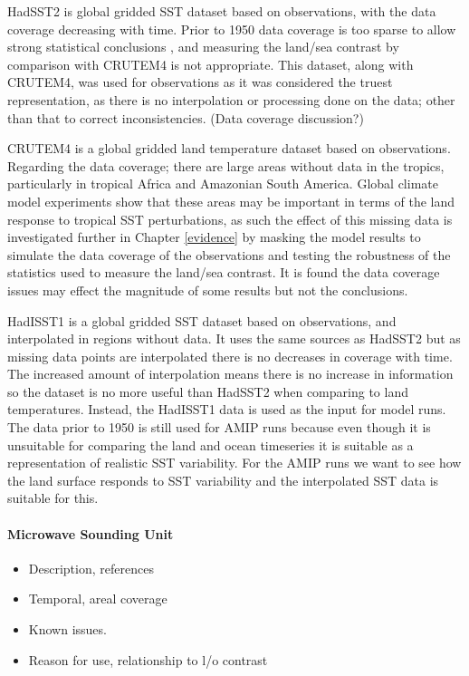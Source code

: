 HadSST2 is global gridded SST dataset based on observations, with the data 
coverage decreasing with time. Prior to 1950 data coverage is too sparse to 
allow strong statistical conclusions \citep{Dommenget2009}, and measuring the 
land/sea contrast by comparison with CRUTEM4 is not appropriate. This dataset, 
along with CRUTEM4, was used for observations as it was considered the truest 
representation, as there is no interpolation or processing done on the data; 
other than that to correct inconsistencies. (Data coverage discussion?)

CRUTEM4 is a global gridded land temperature dataset based on observations.  
Regarding the data coverage; there are large areas without data in the tropics, 
particularly in tropical Africa and Amazonian South America. Global climate 
model experiments show that these areas may be important in terms of the land 
response to tropical SST perturbations, as such the effect of this missing data 
is investigated further in Chapter \ref{evidence} by masking the model results 
to simulate the data coverage of the observations and testing the robustness of 
the statistics used to measure the land/sea contrast. It is found the data 
coverage issues may effect the magnitude of some results but not the 
conclusions.

HadISST1 is a global gridded SST dataset based on observations, and interpolated 
in regions without data. It uses the same sources as HadSST2 but as missing data 
points are interpolated there is no decreases in coverage with time. The 
increased amount of interpolation means there is no increase in information so 
the dataset is no more useful than HadSST2 when comparing to land temperatures.  
Instead, the HadISST1 data is used as the input for model runs. The data prior 
to 1950 is still used for AMIP runs because even though it is unsuitable for 
comparing the land and ocean timeseries	it is suitable as a representation of 
realistic SST variability. For the AMIP runs we want to see how the land surface 
responds to SST variability and the interpolated SST data is suitable for this.

\paragraph{Microwave Sounding Unit}
\begin{itemize}
	\item Description, references
	\item Temporal, areal coverage
	\item Known issues.
	\item Reason for use, relationship to l/o contrast
\end{itemize}



